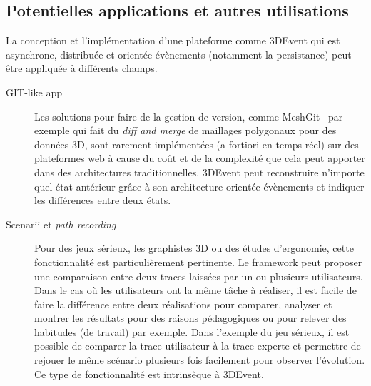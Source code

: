 \subsection{Potentielles applications et autres utilisations}
La conception et l'implémentation d'une plateforme comme 3DEvent qui est 
asynchrone, distribuée et orientée évènements  (notamment la persistance) peut 
être appliquée à différents champs.
\begin{description}
	\item[GIT-like app] Les solutions pour faire de la gestion de version, comme 
	MeshGit~\cite{Denning2013} par exemple qui fait du
	\textit{diff and merge} de maillages polygonaux pour des données 3D, 
	sont rarement implémentées (a fortiori en 
	temps-réel) sur des plateformes web à cause du coût et de la complexité que 
	cela peut apporter dans des architectures traditionnelles. 3DEvent peut 
	reconstruire n'importe quel état antérieur grâce à son architecture orientée 
	évènements et indiquer les différences entre deux états.%
	
	\item[Scenarii et \textit{path recording}] Pour des jeux sérieux, les graphistes 
	3D ou des études d'ergonomie, cette fonctionnalité est particulièrement 
	pertinente. Le \gls{framework} peut proposer une comparaison entre deux traces 
	laissées par un ou plusieurs utilisateurs. Dans le cas où les utilisateurs ont la 
	même tâche à réaliser, il est facile de faire la différence entre deux réalisations 
	pour comparer, analyser et montrer les résultats	pour des raisons 
	pédagogiques ou pour relever des habitudes (de travail) par exemple. Dans 
	l'exemple du jeu sérieux, il est possible de comparer la trace utilisateur à la trace experte 
	et permettre de rejouer le même scénario plusieurs fois facilement pour 
	observer l'évolution. Ce type de fonctionnalité est intrinsèque à 3DEvent. 
	

\end{description}
